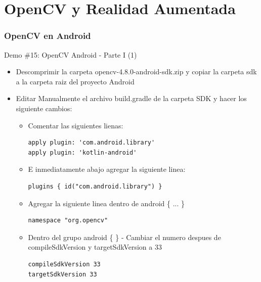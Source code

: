 \documentclass[aspectratio=169,compress]{beamer}
\begin{document}
\section[OpenCV y RA]{OpenCV y Realidad Aumentada}
\begin{frame}[fragile]
\frametitle{OpenCV en Android}
\begin{block}{Demo \#15: OpenCV Android - Parte I (1)}
\begin{itemize}
\item Descomprimir la carpeta opencv-4.8.0-android-sdk.zip y copiar la carpeta sdk a la carpeta raiz del proyecto Android
\item Editar Manualmente el archivo build.gradle de la carpeta SDK y hacer los siguiente cambios: 
\begin{itemize}
\item Comentar las siguientes lienas:
\begin{verbatim}
apply plugin: 'com.android.library'
apply plugin: 'kotlin-android'
\end{verbatim}
\item E inmediatamente abajo agregar la siguiente linea:
\begin{verbatim}
plugins { id("com.android.library") }
\end{verbatim}
\item Agregar la siguiente linea dentro de android \{ ... \}
\begin{verbatim}
namespace "org.opencv"
\end{verbatim}
\item Dentro del grupo android \{ \} - Cambiar el numero despues de compileSdkVersion y targetSdkVersion a 33
\begin{verbatim}
compileSdkVersion 33
targetSdkVersion 33
\end{verbatim}
\end{itemize}
\end{itemize}
\end{block}
\end{frame}
\end{document}
